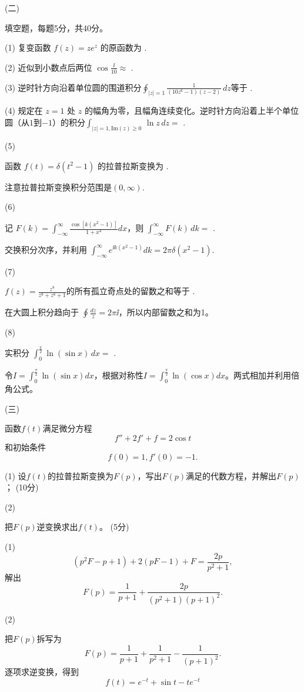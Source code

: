 \documentclass[12pt,CJK]{article}
\begin{document}
\item[(二)]{ 填空题，每题5分，共40分。


  \bitem
\item[(1)]{复变函数 $f(z)= ze^z$ 的原函数为 .}      
\item[(2)]{近似到小数点后两位 $ \cos \frac{\ii}{10} \approx$  .}
\item[(3)]{逆时针方向沿着单位圆的围道积分$\oint_{|z|=1}\frac{1}{(10z^{6}-1)(z-2)}\,dz$等于 .}
\item[(4)]{规定在 $z=1$ 处 $z$ 的幅角为零，且幅角连续变化。逆时针方向沿着上半个单位圆（从$1$到$-1$）的积分$\int_{|z|=1, \mathrm{Im}(z)\ge 0}\, \ln z \,dz = $ .}
\item[(5)]{ 函数 $f(t) = \delta(t^2-1)$ 的拉普拉斯变换为 .

{\small \red 注意拉普拉斯变换积分范围是$(0,\infty)$.}
}
\item[(6)]{记 $ F(k) = \int_{-\infty}^\infty \frac{\cos{\left[k(x^2-1)\right]}}{1+x^4} dx $，则 $ \int_{-\infty}^\infty F(k)\, dk = $ \ans{$\pi$} .

{\small \red 交换积分次序，并利用 $\int_{-\infty}^\infty e^{\ii k(x^2-1)}dk  = 2\pi \delta(x^2-1)$.}
}
\item[(7)]{$f(z) = \frac{z^8}{z^9+z^8+1}$的所有孤立奇点处的留数之和等于 .

{\red\small 在大圆上积分趋向于 $\oint \frac{dz}{z} = 2\pi \ii$，所以内部留数之和为1。}
}
\item[(8)]{实积分 $\int_0^{\frac{\pi}{2}} \ln (\sin x) \, dx  = $  .

  {\red\small 令$I=\int_0^{\frac{\pi}{2}} \ln(\sin x)dx$，根据对称性$I=\int_0^{\frac{\pi}{2}} \ln(\cos x)dx$。两式相加并利用倍角公式。}
}
  \eitem
}

\item[(三)]{函数$f(t)$满足微分方程
  $$f'' + 2f' + f =  2\cos t $$
  和初始条件
  $$f(0) = 1, f'(0) = -1. $$
  \bitem
\item[(1)]{设$f(t)$的拉普拉斯变换为$F(p)$，写出$F(p)$满足的代数方程，并解出$F(p)$； (10分)}
\item[(2)]{把$F(p)$逆变换求出$f(t)$。 (5分)


  \skipline

  {\blue
    \bitem
    \item[(1)]{
    $$(p^2F-p+1) + 2(pF-1) + F = \frac{2p}{p^2+1} ,$$
    解出
    $$F(p)=\frac{1}{p+1}+ \frac{2p}{(p^2+1)(p+1)^2}.$$}
    \item[(2)]{把$F(p)$拆写为
      $$F(p)=\frac{1}{p+1}+ \frac{1}{p^2+1}-\frac{1}{(p+1)^2}.$$
      逐项求逆变换，得到
      $$f(t) = e^{-t} + \sin t - te^{-t} $$

    }
      \eitem

    

    }

}  
  \eitem
}  
  
\eitem


\ech
\end{document}
